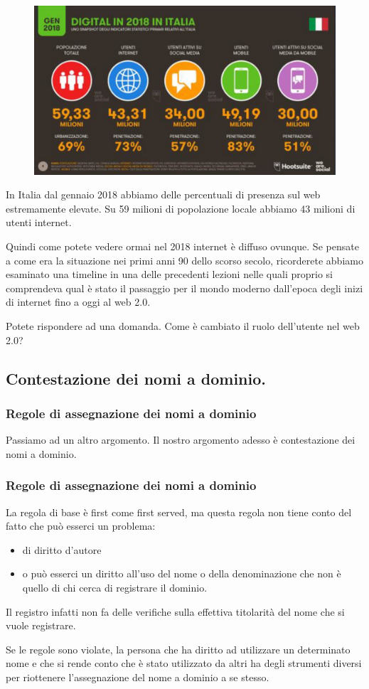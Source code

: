 \begin{figure}[ht]
    \centering
    \includegraphics[width=0.75\linewidth]{images/06_lez_fig_03.jpg}
\end{figure}

In Italia dal gennaio 2018 abbiamo delle percentuali di presenza sul web estremamente elevate. Su 59 milioni di popolazione locale abbiamo 43 milioni di utenti internet. \par
Quindi come potete vedere ormai nel 2018 internet è diffuso ovunque. Se pensate a come era la situazione nei primi anni 90 dello scorso secolo, ricorderete abbiamo esaminato una timeline in una delle precedenti lezioni nelle quali proprio si comprendeva qual è stato il passaggio per il mondo moderno dall'epoca degli inizi di internet fino a oggi al web 2.0. \par
Potete rispondere ad una domanda. Come è cambiato il ruolo dell'utente nel web 2.0?

\subsection{Contestazione dei nomi a dominio.}
\subsubsection{Regole di assegnazione dei nomi a dominio}
Passiamo ad un altro argomento. Il nostro argomento adesso è contestazione dei nomi a dominio.
\subsubsection{Regole di assegnazione dei nomi a dominio}
La regola di base è first come first served, ma questa regola non tiene conto del fatto che può esserci un problema:
\begin{itemize}
    \item di diritto d'autore
    \item o può esserci un diritto all'uso del nome o della denominazione che non è quello di chi cerca di registrare il dominio.
\end{itemize}
Il registro infatti non fa delle verifiche sulla effettiva titolarità del nome che si vuole registrare.   \par
Se le regole sono violate, la persona che ha diritto ad utilizzare un determinato nome e che si rende conto che è stato utilizzato da altri ha degli strumenti diversi per riottenere l'assegnazione del nome a dominio a se stesso.\par

